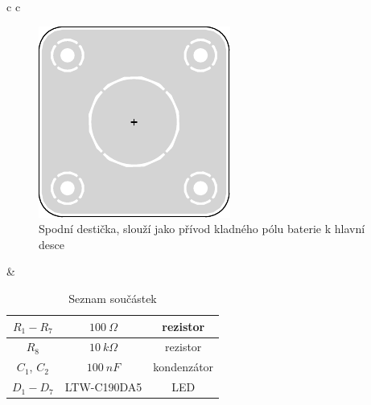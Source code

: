\begin{table}[H]
  \begin{center}
    \begin{tabular}{c c}
      \begin{minipage}{0.48\textwidth}
        \begin{figure}[H]
          \centering
          \includegraphics[width=\textwidth]{../design/svg/osazovak_spodek.pdf}
          \caption{Spodní destička, slouží jako přívod kladného pólu baterie k hlavní desce}
          \label{img:4}
        \end{figure}
      \end{minipage}
  			&  				
      \begin{minipage}{0.48\textwidth}
        \begin{table}[H]
        	\centering
        	\caption{Seznam součástek}
        	\vspace{5mm}
        	\begin{tabular}{c | c | c}
        		$R_1 - R_7$ & $100~\Omega$ & rezistor \\\hline
        		$R_8$ & $10~k\Omega$ & rezistor \\\hline
        		$C_1$, $C_2$ & $100~nF$ & kondenzátor \\\hline
        		$D_1 - D_7$ & LTW-C190DA5 & LED \\\hline

\end{tabular}
\end{table}
\end{minipage}
\end{tabular}
\end{center}
\end{table}
